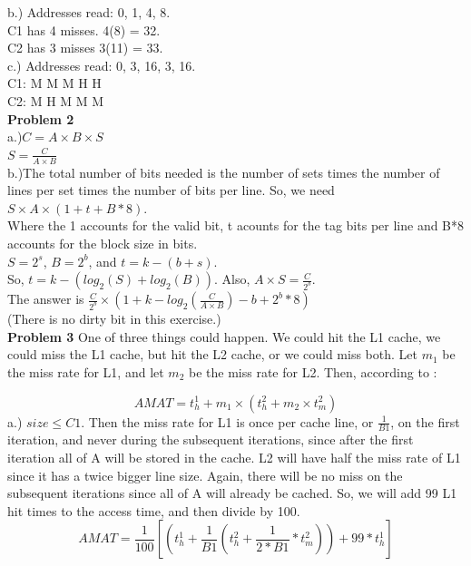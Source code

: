 \documentclass{article} %
\begin{document}
b.) Addresses read: 0, 1, 4, 8.\\
C1 has 4 misses. 4(8) = 32.\\
C2 has 3 misses 3(11) = 33.\\

c.)  Addresses read: 0, 3, 16, 3, 16.\\
C1: M M M H H\\
C2: M H M M M\\

\textbf{Problem 2}\\
a.)$ C = A \times B \times S$ \\
$S = \frac{C}{A\times B}$\\

b.)The total number of bits needed is  the number of sets times the number of lines per set times the number of bits per line. So,  we need $S\times A \times (1 + t + B*8)$.\\
Where the 1 accounts for the valid bit, t acounts for the tag bits per line and B*8 accounts for the block size in bits.\\
$S = 2^s$, $B = 2^b$, and $t = k - (b + s)$.\\
So, $t = k - (log_2(S) + log_2(B))$. Also, $A\times S = \frac{C}{2^b}.$\\
The answer is $\frac C{2^b}\times (1+ k - log_2(\frac{C}{A\times B}) - b + 2^b*8)$\\
(There is no dirty bit in this exercise.)\\

\textbf{Problem 3} One of three things could happen. We could hit the L1 cache, we could  miss the L1 cache, but hit the L2 cache, or we could miss both. Let $m_1$  be the miss rate for L1, and let $m_2$ be the miss rate for L2. Then, according to \cite{L2}:

\begin{equation}
AMAT = t_h^1 + m_1\times(t_h^2+m_2\times t_m^2)
\end{equation}
a.)	$size \le C1$. Then the miss rate for L1 is once per cache line, or $\frac{1}{B1}$, on the first iteration, and never during the subsequent iterations, since after the first iteration all of A will be stored in the cache. L2 will have half the miss rate of L1 since it has a twice bigger line size. Again, there will be no miss on the subsequent iterations since all of A will already be cached. So, we will add 99 L1 hit times to the access time, and then divide by 100.
\begin{equation}
AMAT = \frac1{100}[(t_h^1+\frac{1}{B1}(t_h^2 + \frac{1}{2*B1}*t_m^2)) + 99*t_h^1]
\end{equation}
\end{document}
